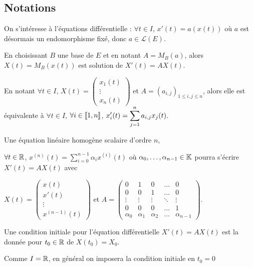 \subsection{Notations}

On s'intéresse à l'équations différentielle : $\forall t \in I$, $x'(t) = a(x(t))$
où $a$ est désormais un endomorphisme fixé, donc $a \in \mathscr L(E)$.

En choisissant $B$ une base de $E$ et en notant $A = M_B(a)$, 
alors $X(t) = M_B(x(t))$ est solution de $X'(t) = A X(t)$.

En notant $\forall t \in I$, $X(t) = \begin{pmatrix}
    x_1(t) \\ \vdots \\ x_n(t)
\end{pmatrix}$ et $A = (a_{i, j})_{1 \leqslant i, j \leqslant n}$, alors elle est équivalente 
à $\forall t \in I$, $\forall i \in [\![1, n]\!]$, $\displaystyle x'_i(t) = \sum_{j = 1}^{n} a_{i, j} x_j(t)$.

\begin{remarque}
    Une équation linéaire homogène scalaire d'ordre $n$, 

    $\forall t \in \mathbb{R}$, $x^{(n)}(t) = \sum_{i = 0}^{n - 1} \alpha_i x^{(i)}(t)$ 
    où $\alpha_0, \dots, \alpha_{n - 1} \in \mathbb{K}$ pourra s'écrire 
    $X'(t) = AX(t)$ avec 
    
    $X(t) = \begin{pmatrix}
    x(t) \\ x'(t) \\ \vdots \\ x^{(n - 1)}(t)
    \end{pmatrix}$ et $A = \begin{pmatrix}
    0 & 1 & 0 & \dots & 0 \\
    0 & 0 & 1 & \dots & 0 \\
    \vdots & \vdots & \vdots & \ddots & \vdots \\
    0 & 0 & 0 & \dots & 1 \\
    \alpha_0 & \alpha_1 & \alpha_2 & \dots & \alpha_{n - 1}
    \end{pmatrix}$.
\end{remarque}

\begin{remarque}
    Une condition initiale pour l'équation différentielle $X'(t) = A X(t)$ est 
    la donnée pour $t_0 \in \mathbb{R}$ de $X(t_0) = X_0$. 

    Comme $I = \mathbb{R}$, en général on imposera la condition initiale en $t_0 = 0$
\end{remarque}

